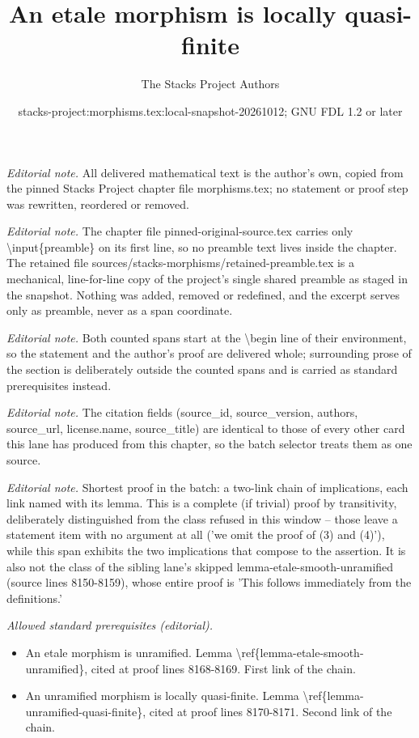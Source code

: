 \documentclass[10pt,a4paper]{amsart}
\title{An etale morphism is locally quasi-finite}
\author{The Stacks Project Authors}
\date{stacks-project:morphisms.tex:local-snapshot-20261012; GNU FDL 1.2 or later}
\theoremstyle{plain}
\theoremstyle{definition}
\theoremstyle{remark}
\numberwithin{equation}{subsection}
\begin{document}
\maketitle
\setcounter{subsection}{1}
\noindent\textit{Editorial note.} All delivered mathematical text is the author's own, copied from the pinned Stacks Project chapter file morphisms.tex; no statement or proof step was rewritten, reordered or removed.\par\medskip
\noindent\textit{Editorial note.} The chapter file pinned-original-source.tex carries only \textbackslash{}input\{preamble\} on its first line, so no preamble text lives inside the chapter. The retained file sources/stacks-morphisms/retained-preamble.tex is a mechanical, line-for-line copy of the project's single shared preamble as staged in the snapshot. Nothing was added, removed or redefined, and the excerpt serves only as preamble, never as a span coordinate.\par\medskip
\noindent\textit{Editorial note.} Both counted spans start at the \textbackslash{}begin line of their environment, so the statement and the author's proof are delivered whole; surrounding prose of the section is deliberately outside the counted spans and is carried as standard prerequisites instead.\par\medskip
\noindent\textit{Editorial note.} The citation fields (source\_id, source\_version, authors, source\_url, license.name, source\_title) are identical to those of every other card this lane has produced from this chapter, so the batch selector treats them as one source.\par\medskip
\noindent\textit{Editorial note.} Shortest proof in the batch: a two-link chain of implications, each link named with its lemma. This is a complete (if trivial) proof by transitivity, deliberately distinguished from the class refused in this window -- those leave a statement item with no argument at all ('we omit the proof of (3) and (4)'), while this span exhibits the two implications that compose to the assertion. It is also not the class of the sibling lane's skipped lemma-etale-smooth-unramified (source lines 8150-8159), whose entire proof is 'This follows immediately from the definitions.'\par\medskip
\noindent\textit{Allowed standard prerequisites (editorial).}\begin{itemize}
\item An etale morphism is unramified. Lemma \textbackslash{}ref\{lemma-etale-smooth-unramified\}, cited at proof lines 8168-8169. First link of the chain.
\item An unramified morphism is locally quasi-finite. Lemma \textbackslash{}ref\{lemma-unramified-quasi-finite\}, cited at proof lines 8170-8171. Second link of the chain.
\end{itemize}\medskip
\end{document}
